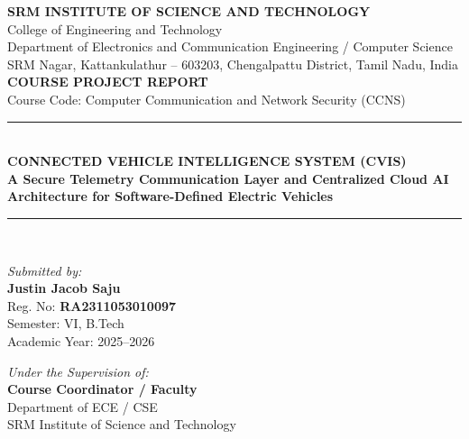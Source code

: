 \documentclass[12pt,a4paper]{report}
\begin{document}
\begin{titlepage}
    \centering
    \vspace*{0.3cm}
    
    {\Large\bfseries\color{cvisnavy} SRM INSTITUTE OF SCIENCE AND TECHNOLOGY}\\[0.2cm]
    {\large College of Engineering and Technology}\\[0.2cm]
    {\large Department of Electronics and Communication Engineering / Computer Science}\\[0.3cm]
    {\normalsize SRM Nagar, Kattankulathur -- 603203, Chengalpattu District, Tamil Nadu, India}\\[1.2cm]
    
    {\large\bfseries COURSE PROJECT REPORT}\\[0.2cm]
    {\large Course Code: Computer Communication and Network Security (CCNS)}\\[1.0cm]
    
    \rule{\linewidth}{1.2pt}\\[0.4cm]
    {\LARGE\bfseries\color{cvisnavy} CONNECTED VEHICLE INTELLIGENCE SYSTEM (CVIS)}\\[0.3cm]
    {\large\bfseries A Secure Telemetry Communication Layer and Centralized Cloud AI Architecture for Software-Defined Electric Vehicles}\\[0.2cm]
    \rule{\linewidth}{1.2pt}\\[1.2cm]
    
    \begin{minipage}{0.48\textwidth}
        \begin{flushleft} \large
            \emph{Submitted by:}\\
            \textbf{Justin Jacob Saju}\\
            Reg. No: \textbf{RA2311053010097}\\
            Semester: VI, B.Tech\\
            Academic Year: 2025--2026
        \end{flushleft}
    \end{minipage}
    \begin{minipage}{0.48\textwidth}
        \begin{flushright} \large
            \emph{Under the Supervision of:}\\
            \textbf{Course Coordinator / Faculty}\\
            Department of ECE / CSE\\
            SRM Institute of Science and Technology
        \end{flushright}
    \end{minipage}\\[1.5cm]
    

\end{titlepage}
\end{document}
